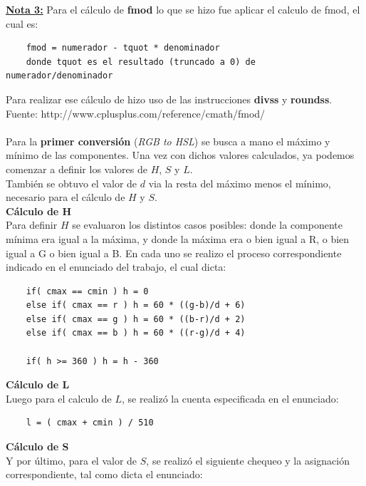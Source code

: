 \underline{\textbf{Nota 3:}} Para el cálculo de \textbf{fmod} lo que se hizo fue aplicar el calculo de fmod, el cual es:
\begin{verbatim}
	fmod = numerador - tquot * denominador
	donde tquot es el resultado (truncado a 0) de numerador/denominador
\end{verbatim}
Para realizar ese cálculo de hizo uso de las instrucciones \textbf{divss} y \textbf{roundss}.\\
Fuente: http://www.cplusplus.com/reference/cmath/fmod/ \\\\

Para la \textbf{primer conversión} (\textit{RGB to HSL}) se busca a mano el máximo y mínimo de las componentes. Una vez con dichos valores calculados, ya podemos comenzar a definir los valores de $H$, $S$ y $L$.\\
También se obtuvo el valor de $d$ via la resta del máximo menos el mínimo, necesario para el cálculo de $H$ y $S$.\\



\textbf{Cálculo de H}\\
Para definir $H$ se evaluaron los distintos casos posibles:
donde la componente mínima era igual a la máxima, y donde la máxima era o bien igual a R, o bien igual a G o bien igual a B. En cada uno se realizo el proceso correspondiente indicado en el enunciado del trabajo, el cual dicta:

\begin{verbatim}
	if( cmax == cmin ) h = 0
	else if( cmax == r ) h = 60 * ((g-b)/d + 6)
	else if( cmax == g ) h = 60 * ((b-r)/d + 2)
	else if( cmax == b ) h = 60 * ((r-g)/d + 4)
	    
	if( h >= 360 ) h = h - 360

\end{verbatim}

\textbf{Cálculo de L}\\
Luego para el calculo de $L$, se realizó la cuenta especificada en el enunciado:

\begin{verbatim}
	l = ( cmax + cmin ) / 510

\end{verbatim}

\textbf{Cálculo de S}\\
Y por último, para el valor de $S$, se realizó el siguiente chequeo y la asignación correspondiente, tal como dicta el enunciado:

